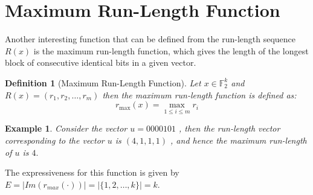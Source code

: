 \documentclass[11 pt]{article}
\numberwithin{equation}{section}
\newtheorem{definition}[theorem]{Definition}
\newtheorem{example}[theorem]{Example}
\begin{document}
\section{Maximum Run-Length Function}
    Another interesting function that can be defined from the run-length sequence $R(x)$ is the maximum run-length function, which gives the length of the longest block of consecutive identical bits in a given vector.

    \begin{definition}[Maximum Run-Length Function]
        Let $x \in \mathbb{F}_2^k$ and $R(x) = (r_1, r_2, \ldots, r_m)$ then the maximum run-length function is defined as:
        $$r_{\max}(x) = \max_{1 \leq i \leq m}r_i$$
    \end{definition}
    
    \begin{example}
        Consider the vector $u = 0000101$ , then the run-length vector corresponding to the vector $u$ is $(4,1,1,1)$ , and hence the maximum run-length of $u$ is $4.$
    \end{example}

    \noindent The expressiveness for this function is given by $E = |Im(r_{max}(\cdot))| = |\{1,2,\dots,k\}| = k$.
\end{document}
